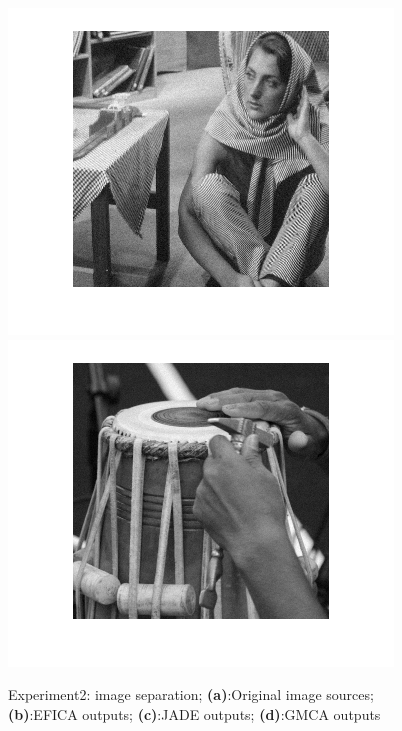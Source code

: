 \begin{figure}
{\begin{minipage}[b]{0.23\linewidth}
\includegraphics[width=1\linewidth]{images/gmca_out3.png}\vspace{4pt}
\includegraphics[width=1\linewidth]{images/gmca_out4.png}
\end{minipage}}
\caption{Experiment2: image separation; \textbf{(a)}:Original image sources; \textbf{(b)}:EFICA outputs; \textbf{(c)}:JADE outputs; \textbf{(d)}:GMCA outputs }
\end{figure}
 

